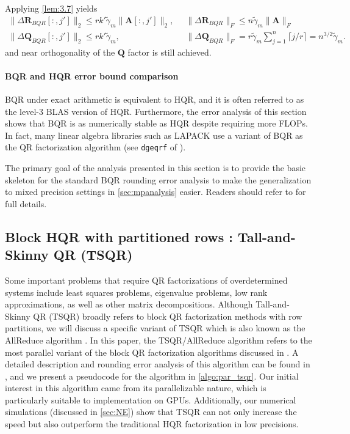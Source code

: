 \documentclass[review,onefignum,onetabnum]{siamart190516}
\newcommand{\bb}[1]{\mathbf{#1}}
\begin{document}
Applying \cref{lem:3.7} yields 
\begin{align}
\|\Delta \bb{R}_{BQR}[:,j']\|_2 \leq rk'\tilde{\gamma}_{m} \|\bb{A}[:,j']\|_2,&\;\; \|\Delta \bb{R}_{BQR}\|_F \leq n\tilde{\gamma}_{m} \|\bb{A}\|_F\\
\|\Delta \bb{Q}_{BQR}[:,j']\|_2 \leq rk'\tilde{\gamma}_{m},&\;\;\|\Delta \bb{Q}_{BQR}\|_F = r\tilde{\gamma}_{m}\sum_{j=1}^n \lceil j/r\rceil = n^{3/2}\tilde{\gamma}_{m}.\label{eqn:BQRmat}
\end{align}
and near orthogonality of the $\bb{Q}$ factor is still achieved.
\paragraph{BQR and HQR error bound comparison}
BQR under exact arithmetic is equivalent to HQR, and it is often referred to as the level-3 BLAS version of HQR. 
Furthermore, the error analysis of this section shows that BQR is as numerically stable as HQR despite requiring more FLOPs.
In fact, many linear algebra libraries such as LAPACK use a variant of BQR as the QR factorization algorithm (see {\tt dgeqrf} of \cite{LAPACK}).

The primary goal of the analysis presented in this section is to provide the basic skeleton for the standard BQR rounding error analysis to make the generalization to mixed precision settings in \cref{sec:mpanalysis} easier.
Readers should refer to \cite{golub2013matrix,Higham2002} for full details.
%
\subsection{Block HQR with partitioned rows : Tall-and-Skinny QR (TSQR)}\label{sec:TSQR}
Some important problems that require QR factorizations of overdetermined systems include least squares problems, eigenvalue problems, low rank approximations, as well as other matrix decompositions.
Although Tall-and-Skinny QR (TSQR) broadly refers to block QR factorization methods with row partitions, we will discuss a specific variant of TSQR which is also known as the AllReduce algorithm \cite{Mori2012}.
In this paper, the TSQR/AllReduce algorithm refers to the most parallel variant of the block QR factorization algorithms discussed in \cite{Demmel2012}.
A detailed description and rounding error analysis of this algorithm can be found in \cite{Mori2012}, and we present a pseudocode for the algorithm in \cref{algo:par_tsqr}.
Our initial interest in this algorithm came from its parallelizable nature, which is particularly suitable to implementation on GPUs. 
Additionally, our numerical simulations (discussed in \cref{sec:NE}) show that TSQR can not only increase the speed but also outperform the traditional HQR factorization in low precisions.
\end{document}
